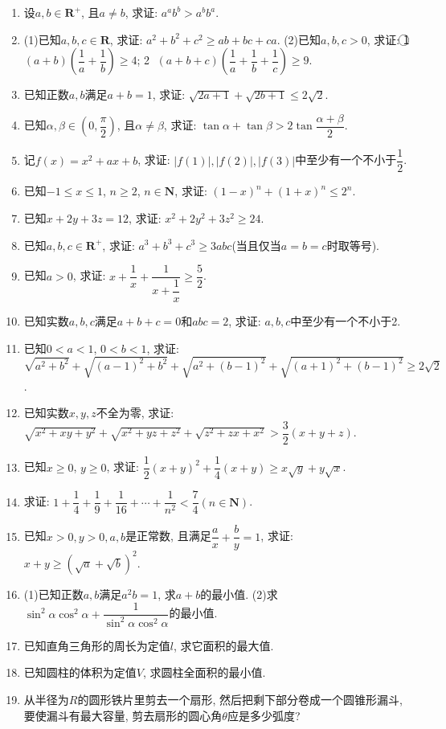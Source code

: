 \documentclass[10pt,a4paper]{article}
\begin{document}
\begin{enumerate}[1.]
    \item 设$a,b\in \mathbf{R}^+$, 且$a\ne b$, 求证: $a^ab^b>a^bb^a$.
    \item (1)已知$a,b,c\in \mathbf{R}$, 求证: $a^2+b^2+c^2\ge ab+bc+ca$.
    (2)已知$a,b,c>0$, 求证:
    \textcircled{1} $(a+b)(\dfrac 1a+\dfrac 1b)\ge 4$; \textcircled{2} $(a+b+c)(\dfrac 1a+\dfrac 1b+\dfrac 1c)\ge 9$.
    \item 已知正数$a,b$满足$a+b=1$, 求证: $\sqrt{2a+1}+\sqrt{2b+1}\le 2\sqrt 2$.
    \item 已知$\alpha ,\beta \in (0,\dfrac{\pi }2)$, 且$\alpha \ne \beta$, 求证: $\tan \alpha +\tan \beta >2\tan \dfrac{\alpha +\beta }2$.
    \item 记$f(x)=x^2+ax+b$, 求证: $|f(1)|,|f(2)|,|f(3)|$中至少有一个不小于$\dfrac 12$.
    \item 已知$-1\le x\le 1$, $n\ge 2$, $n\in \mathbf{N}$, 求证: $(1-x)^n+(1+x)^n\le 2^n$.
    \item 已知$x+2y+3z=12$, 求证: $x^2+2y^2+3z^2\ge 24$.
    \item 已知$a,b,c\in \mathbf{R}^+$, 求证: $a^3+b^3+c^3\ge 3abc$(当且仅当$a=b=c$时取等号).
    \item 已知$a>0$, 求证: $x+\dfrac 1x+\dfrac 1{x+\dfrac 1x}\ge \dfrac 52$.
    \item 已知实数$a,b,c$满足$a+b+c=0$和$abc=2$, 求证: $a,b,c$中至少有一个不小于2.
    \item 已知$0<a<1$, $0<b<1$, 求证: $\sqrt{{a^2}+{b^2}}+\sqrt{(a-1)^2+{b^2}}+\sqrt{{a^2}+(b-1)^2}+\sqrt{(a+1)^2+(b-1)^2}\ge 2\sqrt 2$.
    \item 已知实数$x,y,z$不全为零, 求证: $\sqrt{{x^2}+xy+{y^2}}+\sqrt{{x^2}+yz+{z^2}}+\sqrt{{z^2}+zx+{x^2}}>\dfrac 32(x+y+z)$.
    \item 已知$x\ge 0$, $y\ge 0$, 求证: $\dfrac 12(x+y)^2+\dfrac 14(x+y)\ge x\sqrt y+y\sqrt x$.
    \item 求证: $1+\dfrac 14+\dfrac 19+\dfrac 1{16}+\cdots +\dfrac 1{n^2}<\dfrac 74(n\in \mathbf{N})$.
    \item 已知$x>0,y>0,a,b$是正常数, 且满足$\dfrac ax+\dfrac by=1$, 求证: $x+y\ge (\sqrt a+\sqrt b)^2$.
    \item (1)已知正数$a,b$满足$a^2b=1$, 求$a+b$的最小值.
    (2)求${{\sin }^2}\alpha {{\cos }^2}\alpha +\dfrac 1{{{\sin }^2}\alpha {{\cos }^2}\alpha }$的最小值.
    \item 已知直角三角形的周长为定值$l$, 求它面积的最大值.
    \item 已知圆柱的体积为定值$V$, 求圆柱全面积的最小值.
    \item 从半径为$R$的圆形铁片里剪去一个扇形, 然后把剩下部分卷成一个圆锥形漏斗, 要使漏斗有最大容量, 剪去扇形的圆心角$\theta$应是多少弧度?

\end{enumerate}
\end{document}
